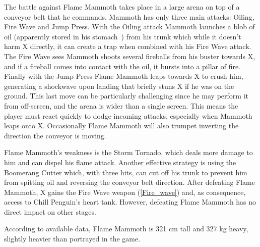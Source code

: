 The battle against Flame Mammoth takes place in a large arena on top of a conveyor belt that he commands. Mammoth has only three main attacks: Oiling, Fire Wave and Jump Press. With the Oiling attack Mammoth launches a blob of oil (apparently stored in his stomach~\cite{wayback:X_resources}) from his trunk which while it doesn't harm X directly, it can create a trap when combined with his Fire Wave attack. The Fire Wave sees Mammoth shoots several fireballs from his buster towards X, and if a fireball comes into contact with the oil, it bursts into a pillar of fire. Finally with the Jump Press Flame Mammoth leaps towards X to crush him, generating a shockwave upon landing that briefly stuns X if he was on the ground. This last move can be particularly challenging since he may perform it from off-screen, and the arena is wider than a single screen. This means the player must react quickly to dodge incoming attacks, especially when Mammoth leaps onto X. Occasionally Flame Mammoth will also trumpet inverting the direction the conveyor is moving. 

Flame Mammoth's weakness is the Storm Tornado, which deals more damage to him and can dispel his flame attack. Another effective strategy is using the Boomerang Cutter which, with three hits, can cut off his trunk to prevent him from spitting oil and reversing the conveyor belt direction. After defeating Flame Mammoth, X gains the Fire Wave weapon (\ref{Fire_wave}) and, as consequence, access to Chill Penguin's heart tank. However, defeating Flame Mammoth has no direct impact on other stages.

According to available data, Flame Mammoth is 321 cm tall and 327 kg heavy, slightly heavier than portrayed in the game.

